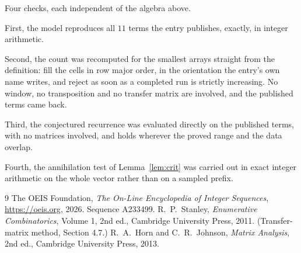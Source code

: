 \documentclass[11pt,a4paper]{article}
\theoremstyle{plain}
\theoremstyle{definition}
\begin{document}
Four checks, each independent of the algebra above.

First, the model reproduces all $11$ terms the entry publishes, exactly, in integer
arithmetic.

Second, the count was recomputed for the smallest arrays straight from the definition: fill the
cells in row major order, in the orientation the entry's own name writes, and reject as soon as
a completed run is strictly increasing. No window, no transposition and no transfer matrix are involved, and
the published terms came back.

Third, the conjectured recurrence was evaluated directly on the published terms, with no
matrices involved, and holds wherever the proved range and the data overlap.

Fourth, the annihilation test of Lemma~\ref{lem:crit} was carried out in exact integer
arithmetic on the whole vector rather than on a sampled prefix.

\begin{thebibliography}{9}
 The OEIS Foundation, \emph{The On-Line Encyclopedia of Integer
Sequences}, \url{https://oeis.org}, 2026. Sequence A233499.
 R.~P.~Stanley, \emph{Enumerative Combinatorics}, Volume 1, 2nd ed.,
Cambridge University Press, 2011. (Transfer-matrix method, Section 4.7.)
 R.~A.~Horn and C.~R.~Johnson, \emph{Matrix Analysis}, 2nd ed., Cambridge
University Press, 2013.
\end{thebibliography}
\end{document}
